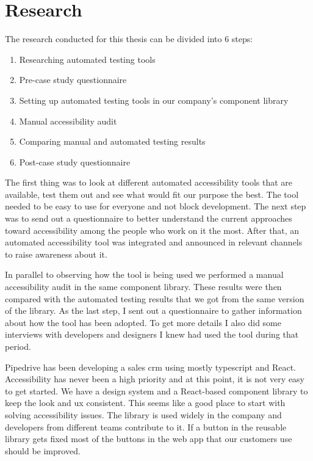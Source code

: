\documentclass{master_thesis}
\begin{document}
\section{Research}

The research conducted for this thesis can be divided into 6 steps:

\begin{enumerate}
	\item Researching automated testing tools
	\item Pre-case study questionnaire
	\item Setting up automated testing tools in our company's component library
	\item Manual accessibility audit
	\item Comparing manual and automated testing results
	\item Post-case study questionnaire
\end{enumerate}

The first thing was to look at different automated accessibility tools that are available, test them out and see what would fit our purpose the best. The tool needed to be easy to use for everyone and not block development. The next step was to send out a questionnaire to better understand the current approaches toward accessibility among the people who work on it the most. After that, an automated accessibility tool was integrated and announced in relevant channels to raise awareness about it.

In parallel to observing how the tool is being used we performed a manual accessibility audit in the same component library. These results were then compared with the automated testing results that we got from the same version of the library. As the last step, I sent out a questionnaire to gather information about how the tool has been adopted. To get more details I also did some interviews with developers and designers I knew had used the tool during that period.

Pipedrive has been developing a sales \ac{crm} using mostly typescript and React. Accessibility has never been a high priority and at this point, it is not very easy to get started. We have a design system and a React-based component library to keep the look and \ac{ux} consistent. This seems like a good place to start with solving accessibility issues. The library is used widely in the company and developers from different teams contribute to it. If a button in the reusable library gets fixed most of the buttons in the web app that our customers use should be improved.
\end{document}
